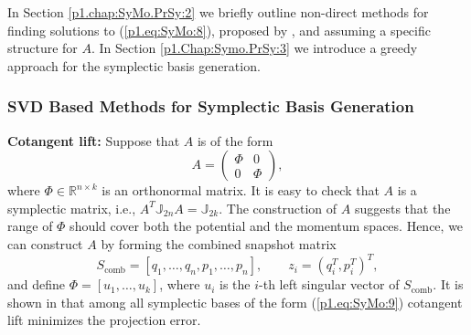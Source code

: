 In Section \ref{p1.chap:SyMo.PrSy:2} we briefly outline non-direct methods for finding solutions to (\ref{p1.eq:SyMo:8}), proposed by \cite{doi:10.1137/140978922}, and assuming a specific structure for $A$. In Section \ref{p1.Chap:Symo.PrSy:3} we introduce a greedy approach for the symplectic basis generation.

\subsubsection{SVD Based Methods for Symplectic Basis Generation} \label{chap:SyMo.PrSy:2} 
{\bf Cotangent lift:} Suppose that $A$ is of the form
\begin{equation} \label{p1.eq:SyMo:9}
	A = 
	\begin{pmatrix}
		\Phi & 0 \\
		0 & \Phi
	\end{pmatrix},
\end{equation}
where $\Phi \in \mathbb{R}^{n\times k}$ is an orthonormal matrix. It is easy to check that $A$ is a symplectic matrix, i.e., $A^T \mathbb J_{2n} A = \mathbb J_{2k}$. The construction of $A$ suggests that the range of $\Phi$ should cover both the potential and the momentum spaces. Hence, we can construct $A$ by forming the combined snapshot matrix
\begin{equation} \label{p1.eq:SyMo:10}
	S_{\text{comb}} = [q_1,\dots,q_n,p_1,\dots,p_n], \qquad z_i = (q_i^T,p_i^T)^T,
\end{equation}
and define $\Phi=[u_1,\dots,u_k]$, where $u_i$ is the $i$-th left singular vector of $S_{\text{comb}}$. It is shown in \cite{doi:10.1137/140978922} that among all symplectic bases of the form (\ref{p1.eq:SyMo:9}) cotangent lift minimizes the projection error.


